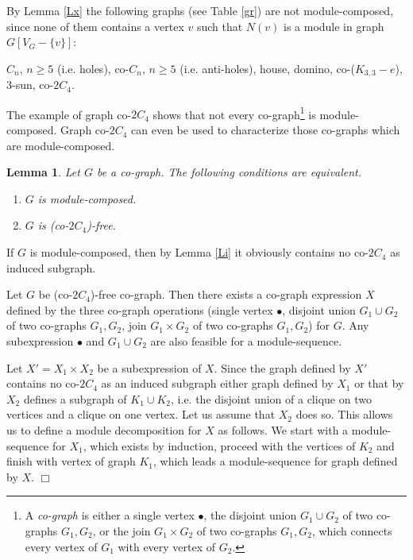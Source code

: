 \documentclass[11pt]{article}
\newtheorem{lemma}[theorem]{Lemma}
\newenvironment{proof}{\noindent{\bf Proof~}}{\null\hfill $\Box$\par\medskip}
\begin{document}
By Lemma \ref{Lx} the following graphs (see Table \ref{gr}) are  not module-compo\-sed,
since none of them contains a vertex $v$ such that $N(v)$ is a module in graph $G[V_G-\{v\}]$:

$C_n$, $n\ge 5$ (i.e. holes), co-$C_n$, $n\ge 5$ (i.e. anti-holes), house,  domino,  
co-($K_{3,3}-e$), 3-sun, co-$2C_4$.




The example of graph co-$2C_4$ shows that not every co-graph\footnote{A {\em co-graph} is either a  single vertex $\bullet$,
the disjoint union $G_1 \cup G_2$ of two co-graphs $G_1,G_2$, or the join  $G_1 \times G_2$ of two co-graphs $G_1,G_2$, which connects every vertex of $G_1$ with every vertex of $G_2$. } is module-compo\-sed. Graph co-$2C_4$ can even be used to characterize those co-graphs which are module-composed.


\begin{lemma}\label{Lco}
Let $G$ be a co-graph. The following conditions are equivalent.
\begin{enumerate}
\item $G$ is module-composed.

\item $G$ is (co-$2C_4$)-free.
\end{enumerate}
\end{lemma}


\begin{proof}
If $G$ is module-composed, then by Lemma \ref{Li} it obviously contains no co-$2C_4$ as induced subgraph.

Let $G$ be (co-$2C_4$)-free co-graph. Then there exists a co-graph expression $X$ defined by the three co-graph operations (single vertex $\bullet$,
disjoint union $G_1 \cup G_2$ of two co-graphs $G_1,G_2$, join  $G_1 \times G_2$ of two co-graphs $G_1,G_2$) for $G$.  Any subexpression $\bullet$ and  $G_1 \cup G_2$
are also feasible for a module-sequence. 

Let $X'=X_1 \times X_2$
be a subexpression of $X$. Since the graph defined by $X'$ contains no co-$2C_4$ as an induced subgraph either graph defined by $X_1$ or that by $X_2$ defines a subgraph of $K_1\cup K_2$, i.e. the disjoint union of a clique 
on two vertices and a clique on one vertex. Let us assume that  $X_2$ does so.  This allows us to define
a module decomposition for $X$ as follows. We start with
a module-sequence for $X_1$, which exists by induction, proceed with
the vertices of $K_2$ and finish with vertex of graph $K_1$,
which leads a module-sequence for graph defined by $X$.
\end{proof}
\end{document}
